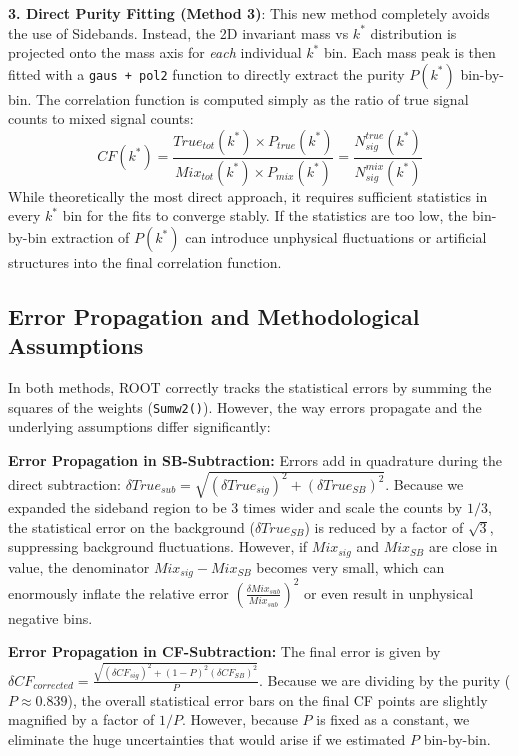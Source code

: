 \documentclass[11pt,a4paper]{article}
\begin{document}
\textbf{3. Direct Purity Fitting (Method 3)}:
This new method completely avoids the use of Sidebands. Instead, the 2D invariant mass vs $k^*$ distribution is projected onto the mass axis for \textit{each} individual $k^*$ bin. Each mass peak is then fitted with a \texttt{gaus + pol2} function to directly extract the purity $P(k^*)$ bin-by-bin. The correlation function is computed simply as the ratio of true signal counts to mixed signal counts:
\begin{equation}
    CF(k^*) = \frac{True_{tot}(k^*) \times P_{true}(k^*)}{Mix_{tot}(k^*) \times P_{mix}(k^*)} = \frac{N_{sig}^{true}(k^*)}{N_{sig}^{mix}(k^*)}
\end{equation}
While theoretically the most direct approach, it requires sufficient statistics in every $k^*$ bin for the fits to converge stably. If the statistics are too low, the bin-by-bin extraction of $P(k^*)$ can introduce unphysical fluctuations or artificial structures into the final correlation function.

\subsection{Error Propagation and Methodological Assumptions}
In both methods, ROOT correctly tracks the statistical errors by summing the squares of the weights (\texttt{Sumw2()}). 
However, the way errors propagate and the underlying assumptions differ significantly:

\textbf{Error Propagation in SB-Subtraction:}
Errors add in quadrature during the direct subtraction: $\delta True_{sub} = \sqrt{(\delta True_{sig})^2 + (\delta True_{SB})^2}$. 
Because we expanded the sideband region to be 3 times wider and scale the counts by $1/3$, the statistical error on the background ($\delta True_{SB}$) is reduced by a factor of $\sqrt{3}$, suppressing background fluctuations.
However, if $Mix_{sig}$ and $Mix_{SB}$ are close in value, the denominator $Mix_{sig} - Mix_{SB}$ becomes very small, which can enormously inflate the relative error $\left( \frac{\delta Mix_{sub}}{Mix_{sub}} \right)^2$ or even result in unphysical negative bins.

\textbf{Error Propagation in CF-Subtraction:}
The final error is given by $\delta CF_{corrected} = \frac{\sqrt{(\delta CF_{sig})^2 + (1-P)^2 (\delta CF_{SB})^2}}{P}$.
Because we are dividing by the purity ($P \approx 0.839$), the overall statistical error bars on the final CF points are slightly magnified by a factor of $1/P$.
However, because $P$ is fixed as a constant, we eliminate the huge uncertainties that would arise if we estimated $P$ bin-by-bin.
\end{document}
